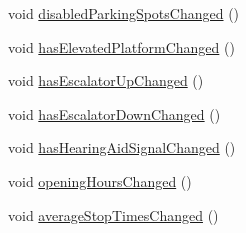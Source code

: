 \begin{DoxyCompactItemize}
\item 
void \mbox{\hyperlink{classCSA_1_1Station_ad47a8ed217f646cce8661181dd4abcb8}{disabled\+Parking\+Spots\+Changed}} ()
\item 
void \mbox{\hyperlink{classCSA_1_1Station_a691c6d02127421821b41cfb40381781c}{has\+Elevated\+Platform\+Changed}} ()
\item 
void \mbox{\hyperlink{classCSA_1_1Station_a281adc596cffb53280beb8276ce9b0c5}{has\+Escalator\+Up\+Changed}} ()
\item 
void \mbox{\hyperlink{classCSA_1_1Station_a10898e5f4146f47f734c19708f614361}{has\+Escalator\+Down\+Changed}} ()
\item 
void \mbox{\hyperlink{classCSA_1_1Station_a21cce284fffaf5d90806c87eb827e021}{has\+Hearing\+Aid\+Signal\+Changed}} ()
\item 
void \mbox{\hyperlink{classCSA_1_1Station_a3f709e2a3661ed162d888aebff54144f}{opening\+Hours\+Changed}} ()
\item 
void \mbox{\hyperlink{classCSA_1_1Station_a96d22182cdb97e5c6ebe8468ffd5d8e7}{average\+Stop\+Times\+Changed}} ()
\end{DoxyCompactItemize}
